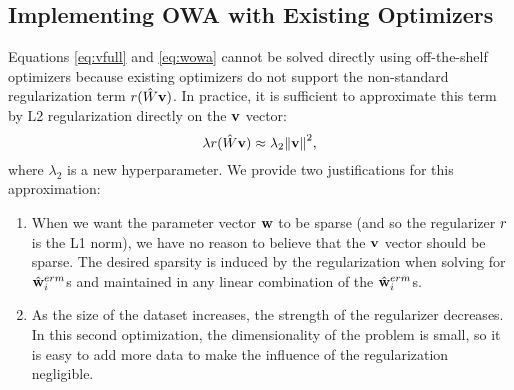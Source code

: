 \documentclass[thesis.tex]{subfiles}
\newcommand{\nowa}{n^{\textit{owa}}}
\begin{document}
%

\subsection{Implementing OWA with Existing Optimizers}
\label{sec:lambda2}

Equations \ref{eq:vfull} and \ref{eq:wowa} cannot be solved directly using off-the-shelf optimizers because existing optimizers do not support the non-standard regularization term $r(\hat W\mathbf{v})$.
In practice, it is sufficient to approximate this term by L2 regularization directly on the $\mathbf{v}$ vector:
\begin{equation}
\lambda r(\hat W\mathbf{v}) \approx \lambda_2 {\lVert {\mathbf{v}} \rVert}^2
,
\label{eq:approxreg}
\end{equation}
where $\lambda_2$ is a new hyperparameter.
We provide two justifications for this approximation:

\vspace{-0.05in}
\begin{enumerate}[leftmargin=0.15in]
\item
When we want the parameter vector $\mathbf w$ to be sparse 
(and so the regularizer $r$ is the L1 norm), 
we have no reason to believe that the $\mathbf{v}$ vector should be sparse.
The desired sparsity is induced by the regularization when solving for $\hat{\mathbf w}^{erm}_i$s and maintained in any linear combination of the $\hat{\mathbf w}^{erm}_i$s.
\item
As the size of the dataset increases, the strength of the regularizer decreases.
In this second optimization, the dimensionality of the problem is small,
so it is easy to add more data to make the influence of the regularization negligible.
\end{enumerate}
\end{document}

